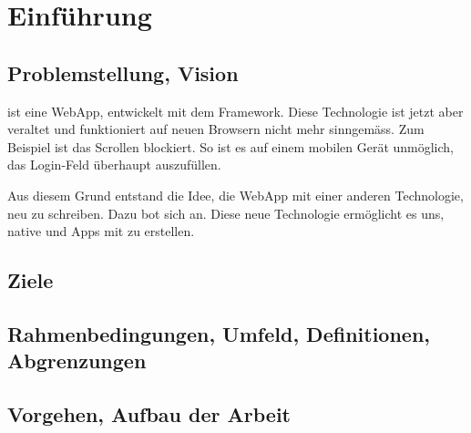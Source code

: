 \chapter{Einführung}
\label{tb-einfuehrung}

\section{Problemstellung, Vision}
\kort{} ist eine \gls{WebApp}, entwickelt mit dem  \gls{Framework}.
Diese Technologie ist jetzt aber veraltet und funktioniert auf neuen Browsern nicht mehr sinngemäss.
Zum Beispiel ist das Scrollen blockiert.
So ist es auf einem mobilen Gerät unmöglich, das Login-Feld überhaupt auszufüllen.

Aus diesem Grund entstand die Idee, die \kort{} \gls{WebApp} mit einer anderen Technologie, neu zu schreiben.
Dazu bot sich  an. 
Diese neue Technologie ermöglicht es uns, native  und  Apps mit  zu erstellen. 

\section{Ziele}


\section{Rahmenbedingungen, Umfeld, Definitionen, Abgrenzungen}


\section{Vorgehen, Aufbau der Arbeit}

